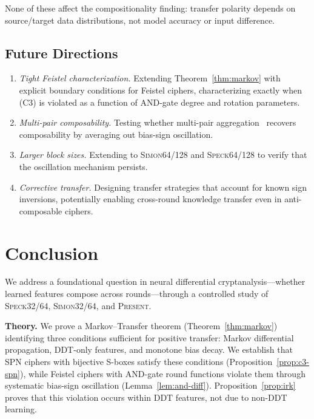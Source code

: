 \documentclass[runningheads]{llncs}
\newcommand{\speck}{\textsc{Speck32/64}}
\newcommand{\simon}{\textsc{Simon32/64}}
\newcommand{\present}{\textsc{Present}}
\begin{document}
None of these affect the compositionality finding: transfer polarity depends on source/target data distributions, not model accuracy or input difference.

\subsection{Future Directions}

\begin{enumerate}[leftmargin=*,itemsep=1pt]
  \item \emph{Tight Feistel characterization.} Extending Theorem~\ref{thm:markov} with explicit boundary conditions for Feistel ciphers, characterizing exactly when (C3) is violated as a function of AND-gate degree and rotation parameters.
  \item \emph{Multi-pair composability.} Testing whether multi-pair aggregation~\cite{zhang2025multipair} recovers composability by averaging out bias-sign oscillation.
  \item \emph{Larger block sizes.} Extending to \textsc{Simon64/128} and \textsc{Speck64/128} to verify that the oscillation mechanism persists.
  \item \emph{Corrective transfer.} Designing transfer strategies that account for known sign inversions, potentially enabling cross-round knowledge transfer even in anti-composable ciphers.
\end{enumerate}


\section{Conclusion}
\label{sec:conclusion}

We address a foundational question in neural differential cryptanalysis---whether learned features compose across rounds---through a controlled study of \speck, \simon, and \present.

\textbf{Theory.}
We prove a Markov--Transfer theorem (Theorem~\ref{thm:markov}) identifying three conditions sufficient for positive transfer: Markov differential propagation, DDT-only features, and monotone bias decay.
We establish that SPN ciphers with bijective S-boxes satisfy these conditions (Proposition~\ref{prop:c3-spn}), while Feistel ciphers with AND-gate round functions violate them through systematic bias-sign oscillation (Lemma~\ref{lem:and-diff}).
Proposition~\ref{prop:irk} proves that this violation occurs within DDT features, not due to non-DDT learning.
\end{document}

